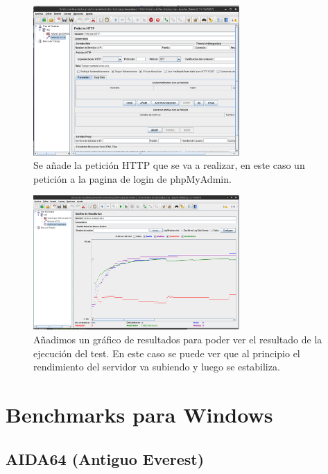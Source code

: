 \begin{figure}[H]
  \begin{center}
    \includegraphics[width=0.7\textwidth]{imagenes/jm3}
    \caption{Se añade la petición HTTP que se va a realizar, en este caso un petición a la pagina de login de phpMyAdmin.}
    \label{fig9}
  \end{center}
\end{figure}

\begin{figure}[H]
  \begin{center}
    \includegraphics[width=0.7\textwidth]{imagenes/jm4}
    \caption{Añadimos un gráfico de resultados para poder ver el resultado de la ejecución del test. En este caso se puede ver que al principio el rendimiento del servidor va subiendo y luego se estabiliza.}
    \label{fig10}
  \end{center}
\end{figure}



\section{Benchmarks para Windows}
\subsection{AIDA64 (Antiguo Everest)}

